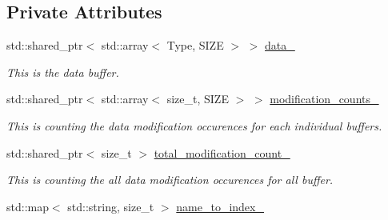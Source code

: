 \subsection*{Private Attributes}
\begin{DoxyCompactItemize}
\item 
std\+::shared\+\_\+ptr$<$ std\+::array$<$ Type, S\+I\+ZE $>$ $>$ \hyperlink{classreal__time__tools_1_1SingletypeThreadsafeObject_abb449516269c85f927246182abee83ff}{data\+\_\+}\hypertarget{classreal__time__tools_1_1SingletypeThreadsafeObject_abb449516269c85f927246182abee83ff}{}\label{classreal__time__tools_1_1SingletypeThreadsafeObject_abb449516269c85f927246182abee83ff}

\begin{DoxyCompactList}\small\item\em This is the data buffer. \end{DoxyCompactList}\item 
std\+::shared\+\_\+ptr$<$ std\+::array$<$ size\+\_\+t, S\+I\+ZE $>$ $>$ \hyperlink{classreal__time__tools_1_1SingletypeThreadsafeObject_a7b242bedc7cd23b419d7928e661fdc10}{modification\+\_\+counts\+\_\+}\hypertarget{classreal__time__tools_1_1SingletypeThreadsafeObject_a7b242bedc7cd23b419d7928e661fdc10}{}\label{classreal__time__tools_1_1SingletypeThreadsafeObject_a7b242bedc7cd23b419d7928e661fdc10}

\begin{DoxyCompactList}\small\item\em This is counting the data modification occurences for each individual buffers. \end{DoxyCompactList}\item 
std\+::shared\+\_\+ptr$<$ size\+\_\+t $>$ \hyperlink{classreal__time__tools_1_1SingletypeThreadsafeObject_a3475e1d35b7af07acdbf74c0170ed45d}{total\+\_\+modification\+\_\+count\+\_\+}
\begin{DoxyCompactList}\small\item\em This is counting the all data modification occurences for all buffer. \end{DoxyCompactList}\item 
std\+::map$<$ std\+::string, size\+\_\+t $>$ \hyperlink{classreal__time__tools_1_1SingletypeThreadsafeObject_a1a27e1934ed7df5119e0e91ca228ac73}{name\+\_\+to\+\_\+index\+\_\+}\hypertarget{classreal__time__tools_1_1SingletypeThreadsafeObject_a1a27e1934ed7df5119e0e91ca228ac73}{}\label{classreal__time__tools_1_1SingletypeThreadsafeObject_a1a27e1934ed7df5119e0e91ca228ac73}


\end{DoxyCompactItemize}
